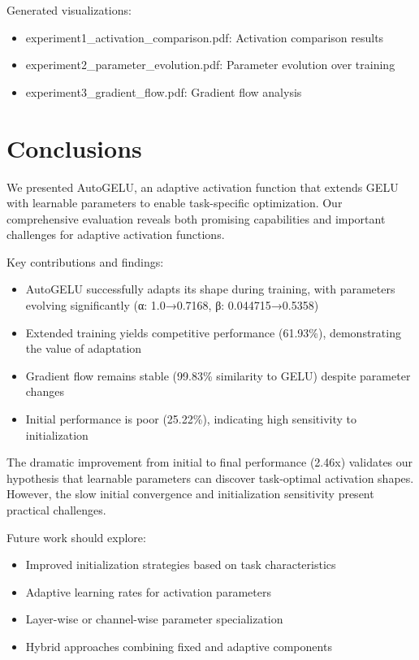 \documentclass[10pt]{article}
\begin{document}
Generated visualizations:
\begin{itemize}
\item experiment1\_activation\_comparison.pdf: Activation comparison results
\item experiment2\_parameter\_evolution.pdf: Parameter evolution over training
\item experiment3\_gradient\_flow.pdf: Gradient flow analysis
\end{itemize}

\section{Conclusions}

We presented AutoGELU, an adaptive activation function that extends GELU with learnable parameters to enable task-specific optimization. Our comprehensive evaluation reveals both promising capabilities and important challenges for adaptive activation functions.

Key contributions and findings:
\begin{itemize}
\item AutoGELU successfully adapts its shape during training, with parameters evolving significantly (α: 1.0→0.7168, β: 0.044715→0.5358)
\item Extended training yields competitive performance (61.93\%), demonstrating the value of adaptation
\item Gradient flow remains stable (99.83\% similarity to GELU) despite parameter changes
\item Initial performance is poor (25.22\%), indicating high sensitivity to initialization
\end{itemize}

The dramatic improvement from initial to final performance (2.46x) validates our hypothesis that learnable parameters can discover task-optimal activation shapes. However, the slow initial convergence and initialization sensitivity present practical challenges.

Future work should explore:
\begin{itemize}
\item Improved initialization strategies based on task characteristics
\item Adaptive learning rates for activation parameters
\item Layer-wise or channel-wise parameter specialization
\item Hybrid approaches combining fixed and adaptive components
\end{itemize}
\end{document}
